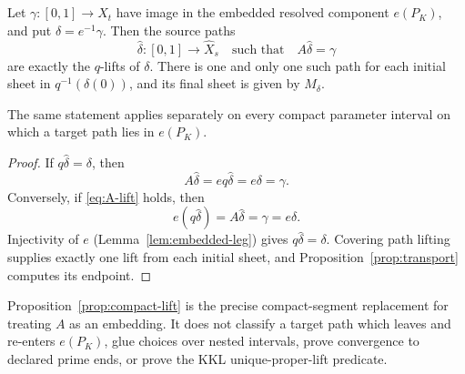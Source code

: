 \begin{proposition}\label{prop:compact-lift}
Let \( \gamma\colon[0,1]\to\widehat X_t \) have image in the embedded resolved component \( e(P_K) \), and put \( \delta=e^{-1}\gamma \).  Then the source paths
\begin{equation}\label{eq:A-lift}
  \widehat\delta\colon[0,1]\to\widehat X_s
  \quad\text{such that}\quad
  A\widehat\delta=\gamma
\end{equation}
are exactly the \( q \)-lifts of \( \delta \).  There is one and only one such path for each initial sheet in \( q^{-1}(\delta(0)) \), and its final sheet is given by \( M_\delta \).

The same statement applies separately on every compact parameter interval on which a target path lies in \( e(P_K) \).
\end{proposition}

\begin{proof}
If \( q\widehat\delta=\delta \), then
\[
  A\widehat\delta=eq\widehat\delta=e\delta=\gamma .
\]
Conversely, if \eqref{eq:A-lift} holds, then
\[
  e(q\widehat\delta)=A\widehat\delta=\gamma=e\delta .
\]
Injectivity of \( e \) (Lemma~\ref{lem:embedded-leg}) gives \( q\widehat\delta=\delta \).  Covering path lifting supplies exactly one lift from each initial sheet, and Proposition~\ref{prop:transport} computes its endpoint.
\end{proof}

\begin{remark}
Proposition~\ref{prop:compact-lift} is the precise compact-segment
replacement for treating \( A \) as an embedding.  It does not
classify a target path which leaves and re-enters \( e(P_K) \), glue
choices over nested intervals, prove convergence to declared prime
ends, or prove the KKL unique-proper-lift predicate.
\end{remark}